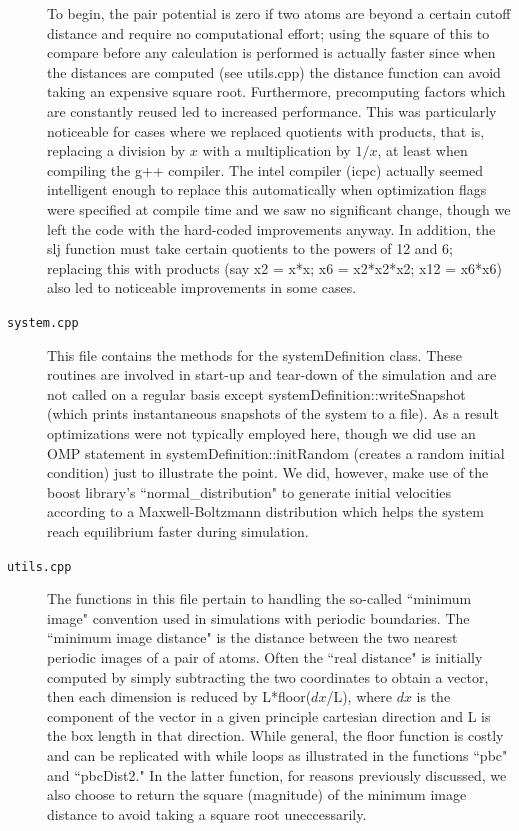 \documentclass[12pt]{article}
\begin{document}
\begin{description}
To begin, the pair potential is zero if two atoms are beyond a certain cutoff distance and require no computational effort; using the square of this to compare before any calculation is performed is actually faster since when the distances are computed (see utils.cpp) the distance function can avoid taking an expensive square root.  Furthermore, precomputing factors which are constantly reused led to increased performance.  This was particularly noticeable for cases where we replaced quotients with products, that is, replacing a division by $x$ with a multiplication by $1/x$, at least when compiling the g++ compiler.  The intel compiler (icpc) actually seemed intelligent enough to replace this automatically when optimization flags were specified at compile time and we saw no significant change, though we left the code with the hard-coded improvements anyway.  In addition, the slj function must take certain quotients to the powers of 12 and 6; replacing this with products (say x2 = x*x; x6 = x2*x2*x2; x12 = x6*x6) also led to noticeable improvements in some cases.

\item[\texttt{system.cpp}] 
This file contains the methods for the systemDefinition class.  These routines are involved in start-up and tear-down of the simulation and are not called on a regular basis except systemDefinition::writeSnapshot (which prints instantaneous snapshots of the system to a file).  As a result optimizations were not typically employed here, though we did use an OMP statement in systemDefinition::initRandom (creates a random initial condition) just to illustrate the point.  We did, however, make use of the boost library's ``normal\_distribution" to generate initial velocities according to a Maxwell-Boltzmann distribution which helps the system reach equilibrium faster during simulation.

\item[\texttt{utils.cpp}] 
The functions in this file pertain to handling the so-called ``minimum image" convention used in simulations with periodic boundaries.  The ``minimum image distance" is the distance between the two nearest periodic images of a pair of atoms.  Often the ``real distance" is initially computed by simply subtracting the two coordinates to obtain a vector, then each dimension is reduced by L*floor($dx$/L), where $dx$ is the component of the vector in a given principle cartesian direction and L is the box length in that direction.  While general, the floor function is costly and can be replicated with while loops as illustrated in the functions ``pbc" and ``pbcDist2."  In the latter function, for reasons previously discussed, we also choose to return the square (magnitude) of the minimum image distance to avoid taking a square root uneccessarily.

\end{description}
\end{document}
